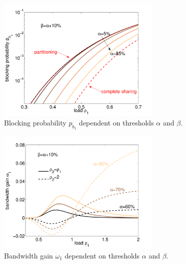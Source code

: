 \begin{figure}[bth]
	\centering
	\includegraphics[width=0.7\textwidth]{aggregation/performance_model/figures/m2_n20_alphaplus2_equal}
 	\caption{Blocking probability $p_{b_1}$ dependent on thresholds $\alpha$ and $\beta$.}
 	\label{fig:m2_n20_alphaplus2_equal}
\end{figure}

\begin{figure}[!bt]
	\centering
	\includegraphics[width=0.7\textwidth]{aggregation/performance_model/figures/bwgain_rhocomp}
 	\caption{Bandwidth gain $\omega_1$ dependent on thresholds $\alpha$ and $\beta$.}
 	\label{fig:bwgain_rhocomp}
\end{figure}


